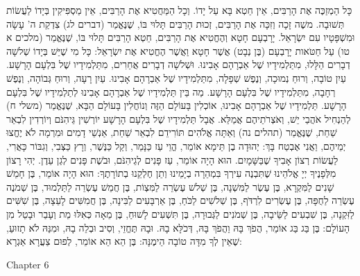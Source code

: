 כָּל הַמְזַכֶּה אֶת הָרַבִּים, אֵין חֵטְא בָּא עַל יָדוֹ. וְכָל הַמַּחֲטִיא אֶת הָרַבִּים, אֵין מַסְפִּיקִין בְּיָדוֹ לַעֲשׂוֹת תְּשׁוּבָה. משֶׁה זָכָה וְזִכָּה אֶת הָרַבִּים, זְכוּת הָרַבִּים תָּלוּי בּוֹ, שֶׁנֶּאֱמַר (דברים לג) צִדְקַת ה' עָשָׂה וּמִשְׁפָּטָיו עִם יִשְׂרָאֵל. יָרָבְעָם חָטָא וְהֶחֱטִיא אֶת הָרַבִּים, חֵטְא הָרַבִּים תָּלוּי בּוֹ, שֶׁנֶּאֱמַר (מלכים א טו) עַל חַטֹּאות יָרָבְעָם (בֶּן נְבָט) אֲשֶׁר חָטָא וַאֲשֶׁר הֶחֱטִיא אֶת יִשְׂרָאֵל:
כָּל מִי שֶׁיֵּשׁ בְּיָדוֹ שְׁלשָׁה דְבָרִים הַלָּלוּ, מִתַּלְמִידָיו שֶׁל אַבְרָהָם אָבִינוּ. וּשְׁלשָׁה דְבָרִים אֲחֵרִים, מִתַּלְמִידָיו שֶׁל בִּלְעָם הָרָשָׁע. עַיִן טוֹבָה, וְרוּחַ נְמוּכָה, וְנֶפֶשׁ שְׁפָלָה, מִתַּלְמִידָיו שֶׁל אַבְרָהָם אָבִינוּ. עַיִן רָעָה, וְרוּחַ גְּבוֹהָה, וְנֶפֶשׁ רְחָבָה, מִתַּלְמִידָיו שֶׁל בִּלְעָם הָרָשָׁע. מַה בֵּין תַּלְמִידָיו שֶׁל אַבְרָהָם אָבִינוּ לְתַלְמִידָיו שֶׁל בִּלְעָם הָרָשָׁע. תַּלְמִידָיו שֶׁל אַבְרָהָם אָבִינוּ, אוֹכְלִין בָּעוֹלָם הַזֶּה וְנוֹחֲלִין בָּעוֹלָם הַבָּא, שֶׁנֶּאֱמַר (משלי ח) לְהַנְחִיל אֹהֲבַי יֵשׁ, וְאֹצְרֹתֵיהֶם אֲמַלֵּא. אֲבָל תַּלְמִידָיו שֶׁל בִּלְעָם הָרָשָׁע יוֹרְשִׁין גֵּיהִנֹּם וְיוֹרְדִין לִבְאֵר שַׁחַת, שֶׁנֶּאֱמַר (תהלים נה) וְאַתָּה אֱלֹהִים תּוֹרִידֵם לִבְאֵר שַׁחַת, אַנְשֵׁי דָמִים וּמִרְמָה לֹא יֶחֱצוּ יְמֵיהֶם, וַאֲנִי אֶבְטַח בָּךְ:
יְהוּדָה בֶן תֵּימָא אוֹמֵר, הֱוֵי עַז כַּנָּמֵר, וְקַל כַּנֶּשֶׁר, וְרָץ כַּצְּבִי, וְגִבּוֹר כָּאֲרִי, לַעֲשׂוֹת רְצוֹן אָבִיךָ שֶׁבַּשָּׁמָיִם. הוּא הָיָה אוֹמֵר, עַז פָּנִים לְגֵיהִנֹּם, וּבֹשֶׁת פָּנִים לְגַן עֵדֶן. יְהִי רָצוֹן מִלְּפָנֶיךָ יְיָ אֱלֹהֵינוּ שֶׁתִּבְנֶה עִירְךָ בִּמְהֵרָה בְיָמֵינוּ וְתֵן חֶלְקֵנוּ בְתוֹרָתֶךָ:
הוּא הָיָה אוֹמֵר, בֶּן חָמֵשׁ שָׁנִים לַמִּקְרָא, בֶּן עֶשֶׂר לַמִּשְׁנָה, בֶּן שְׁלשׁ עֶשְׂרֵה לַמִּצְוֹת, בֶּן חֲמֵשׁ עֶשְׂרֵה לַתַּלְמוּד, בֶּן שְׁמֹנֶה עֶשְׂרֵה לַחֻפָּה, בֶּן עֶשְׂרִים לִרְדֹּף, בֶּן שְׁלשִׁים לַכֹּחַ, בֶּן אַרְבָּעִים לַבִּינָה, בֶּן חֲמִשִּׁים לָעֵצָה, בֶּן שִׁשִּׁים לַזִּקְנָה, בֶּן שִׁבְעִים לַשֵּׂיבָה, בֶּן שְׁמֹנִים לַגְּבוּרָה, בֶּן תִּשְׁעִים לָשׁוּחַ, בֶּן מֵאָה כְּאִלּוּ מֵת וְעָבַר וּבָטֵל מִן הָעוֹלָם:
בֶּן בַּג בַּג אוֹמֵר, הֲפֹךְ בָּהּ וַהֲפֹךְ בָּהּ, דְּכֹלָּא בָהּ. וּבָהּ תֶּחֱזֵי, וְסִיב וּבְלֵה בָהּ, וּמִנַּהּ לֹא תָזוּעַ, שֶׁאֵין לְךָ מִדָּה טוֹבָה הֵימֶנָּה:
בֶּן הֵא הֵא אוֹמֵר, לְפוּם צַעֲרָא אַגְרָא:

Chapter 6


